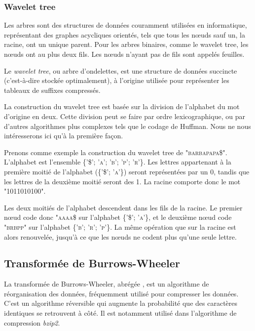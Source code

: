 \subsubsection{Wavelet tree}
Les arbres sont des structures de données couramment utilisées en informatique, représentant des graphes acycliques orientés, tels que tous les nœuds sauf un, la racine, ont un unique parent. Pour les arbres binaires, comme le wavelet tree, les nœuds ont au plus deux fils. Les nœuds n'ayant pas de fils sont appelés feuilles.

Le \textit{wavelet tree}, ou arbre d'ondelettes, est une structure de données succincte (c'est-à-dire stockée optimalement), à l'origine utilisée pour représenter les tableaux de suffixes compressés.

La construction du wavelet tree est basée sur la division de l'alphabet du mot d'origine en deux. Cette division peut se faire par ordre lexicographique, ou par d'autres algorithmes plus complexes tels que le codage de Huffman. Nous ne nous intéresserons ici qu'à la première façon.

Prenons comme exemple la construction du wavelet tree de \textsc{"barbapapa\$"}. L'alphabet est l'ensemble \textsc{\{'\$'; 'a'; 'b'; 'p'; 'r'\}}. Les lettres appartenant à la première moitié de l'alphabet (\textsc{\{'\$'; 'a'\}}) seront représentées par un 0, tandis que les lettres de la deuxième moitié seront des 1. La racine comporte donc le mot "1011010100".

Les deux moitiés de l'alphabet descendent dans les fils de la racine. Le premier nœud code donc \textsc{"aaaa\$} sur l'alphabet \textsc{\{'\$'; 'a'\}}, et le deuxième nœud code \textsc{"brbpp"} sur l'alphabet \textsc{\{'b'; 'r'; 'p'\}}. La même opération que sur la racine est alors renouvelée, jusqu'à ce que les nœuds ne codent plus qu'une seule lettre.


\subsection{Transformée de Burrows-Wheeler}

La transformée de Burrows-Wheeler, abrégée \bwt, est un algorithme de réorganisation des données, fréquemment utilisé pour compresser les données. C'est un algorithme réversible qui augmente la probabilité que des caractères identiques se retrouvent à côté. Il est notamment utilisé dans l'algorithme de compression \emph{bzip2}.

